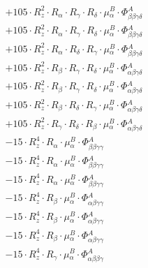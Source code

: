 \documentclass{article}
\begin{document}
\begin{subequations}
\begin{gather}
\begin{array}{c}
 \\[0.2em] 		 + 105 \cdot R_{z}^{2} \cdot R_{\alpha{}} \cdot R_{\gamma{}} \cdot R_{\delta{}} \cdot \mu{}^{B}_{\alpha{}} \cdot \Phi{}^{A}_{\beta{}\beta{}\gamma{}\delta{}} 
 \\[0.2em] 		 + 105 \cdot R_{z}^{2} \cdot R_{\alpha{}} \cdot R_{\gamma{}} \cdot R_{\delta{}} \cdot \mu{}^{B}_{\alpha{}} \cdot \Phi{}^{A}_{\beta{}\beta{}\gamma{}\delta{}} 
 \\[0.2em] 		 + 105 \cdot R_{z}^{2} \cdot R_{\alpha{}} \cdot R_{\delta{}} \cdot R_{\gamma{}} \cdot \mu{}^{B}_{\alpha{}} \cdot \Phi{}^{A}_{\beta{}\beta{}\gamma{}\delta{}} 
 \\[0.2em] 		 + 105 \cdot R_{z}^{2} \cdot R_{\beta{}} \cdot R_{\gamma{}} \cdot R_{\delta{}} \cdot \mu{}^{B}_{\alpha{}} \cdot \Phi{}^{A}_{\alpha{}\beta{}\gamma{}\delta{}} 
 \\[0.2em] 		 + 105 \cdot R_{z}^{2} \cdot R_{\beta{}} \cdot R_{\gamma{}} \cdot R_{\delta{}} \cdot \mu{}^{B}_{\alpha{}} \cdot \Phi{}^{A}_{\alpha{}\beta{}\gamma{}\delta{}} 
 \\[0.2em] 		 + 105 \cdot R_{z}^{2} \cdot R_{\beta{}} \cdot R_{\delta{}} \cdot R_{\gamma{}} \cdot \mu{}^{B}_{\alpha{}} \cdot \Phi{}^{A}_{\alpha{}\beta{}\gamma{}\delta{}} 
 \\[0.2em] 		 + 105 \cdot R_{z}^{2} \cdot R_{\gamma{}} \cdot R_{\delta{}} \cdot R_{\beta{}} \cdot \mu{}^{B}_{\alpha{}} \cdot \Phi{}^{A}_{\alpha{}\beta{}\gamma{}\delta{}} 
 \\[0.2em] 		 - 15 \cdot R_{z}^{4} \cdot R_{\alpha{}} \cdot \mu{}^{B}_{\alpha{}} \cdot \Phi{}^{A}_{\beta{}\beta{}\gamma{}\gamma{}} 
 \\[0.2em] 		 - 15 \cdot R_{z}^{4} \cdot R_{\alpha{}} \cdot \mu{}^{B}_{\alpha{}} \cdot \Phi{}^{A}_{\beta{}\beta{}\gamma{}\gamma{}} 
 \\[0.2em] 		 - 15 \cdot R_{z}^{4} \cdot R_{\alpha{}} \cdot \mu{}^{B}_{\alpha{}} \cdot \Phi{}^{A}_{\beta{}\beta{}\gamma{}\gamma{}} 
 \\[0.2em] 		 - 15 \cdot R_{z}^{4} \cdot R_{\beta{}} \cdot \mu{}^{B}_{\alpha{}} \cdot \Phi{}^{A}_{\alpha{}\beta{}\gamma{}\gamma{}} 
 \\[0.2em] 		 - 15 \cdot R_{z}^{4} \cdot R_{\beta{}} \cdot \mu{}^{B}_{\alpha{}} \cdot \Phi{}^{A}_{\alpha{}\beta{}\gamma{}\gamma{}} 
 \\[0.2em] 		 - 15 \cdot R_{z}^{4} \cdot R_{\beta{}} \cdot \mu{}^{B}_{\alpha{}} \cdot \Phi{}^{A}_{\alpha{}\beta{}\gamma{}\gamma{}} 
 \\[0.2em] 		 - 15 \cdot R_{z}^{4} \cdot R_{\gamma{}} \cdot \mu{}^{B}_{\alpha{}} \cdot \Phi{}^{A}_{\alpha{}\beta{}\beta{}\gamma{}} 

\end{array}
\end{gather}
\end{subequations}
\end{document}
